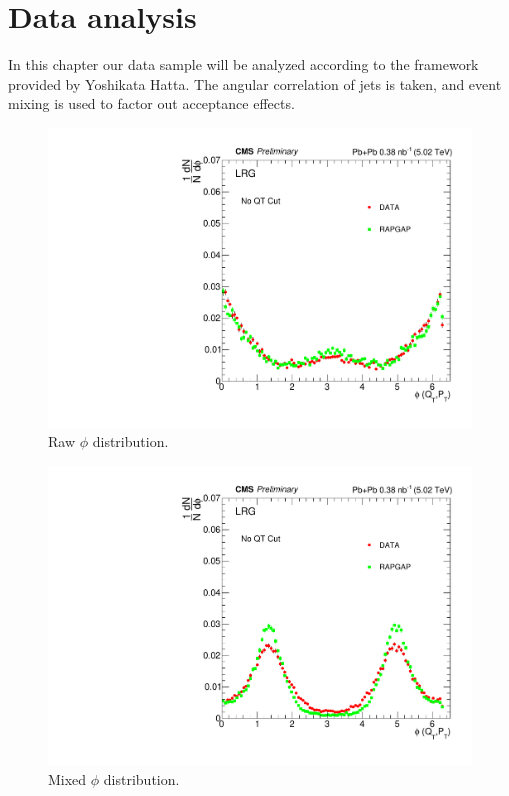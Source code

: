 
\chapter{Data analysis}

In this chapter our data sample will be analyzed according to the framework provided by Yoshikata Hatta. The angular correlation of jets is taken, and event mixing is used to factor out acceptance effects. 

\begin{figure}[h!]
\begin{centering}
\includegraphics[width=6in]{Chapter6/importfigs/phi_allQt_raw.pdf}
\par\end{centering}
\caption{Raw $\phi$ distribution. \label{fig:rawPhi}}
\end{figure}

\begin{figure}[h!]
\begin{centering}
\includegraphics[width=6in]{Chapter6/importfigs/phi_allQt_mixed.pdf}
\par\end{centering}
\caption{Mixed $\phi$ distribution. \label{fig:mixPhi}}
\end{figure}

